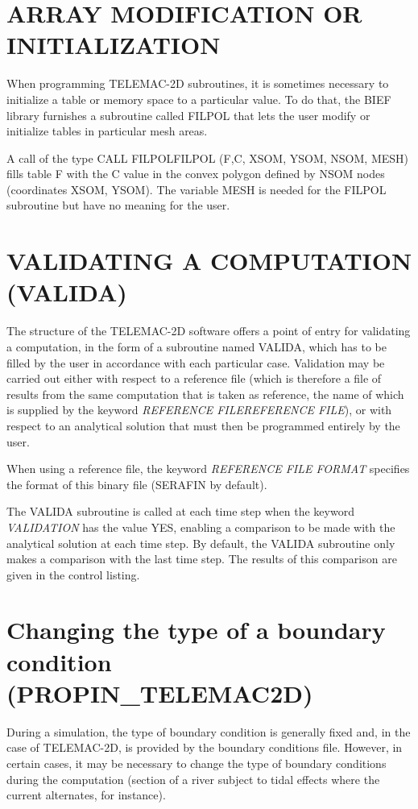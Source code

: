 \section{ ARRAY MODIFICATION OR INITIALIZATION}

 When programming TELEMAC-2D subroutines, it is sometimes necessary to initialize a table or memory space to a particular value. To do that, the BIEF library furnishes a subroutine called FILPOL that lets the user modify or initialize tables in particular mesh areas.

 A call of the type CALL FILPOLFILPOL (F,C, XSOM, YSOM, NSOM, MESH) fills table F with the C value in the convex polygon defined by NSOM nodes (coordinates XSOM, YSOM). The variable MESH is needed for the FILPOL subroutine but have no meaning for the user.


\section{ VALIDATING A COMPUTATION (VALIDA) }

 The structure of the TELEMAC-2D software offers a point of entry for validating a computation, in the form of a subroutine named VALIDA, which has to be filled by the user in accordance with each particular case. Validation may be carried out either with respect to a reference file (which is therefore a file of results from the same computation that is taken as reference, the name of which is supplied by the keyword \textit{REFERENCE FILEREFERENCE FILE}), or with respect to an analytical solution that must then be programmed entirely by the user.

 When using a reference file, the keyword \textit{REFERENCE FILE FORMAT} specifies the format of this binary file (SERAFIN by default).

 The VALIDA subroutine is called at each time step when the keyword \textit{VALIDATION} has the value YES, enabling a comparison to be made with the analytical solution at each time step. By default, the VALIDA subroutine only makes a comparison with the last time step. The results of this comparison are given in the control listing.


\section{ Changing the type of a boundary condition (PROPIN\_TELEMAC2D)}

 During a simulation, the type of boundary condition is generally fixed and, in the case of TELEMAC-2D, is provided by the boundary conditions file. However, in certain cases, it may be necessary to change the type of boundary conditions during the computation (section of a river subject to tidal effects where the current alternates, for instance).

